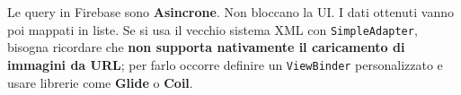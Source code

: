 Le query in Firebase sono \textbf{Asincrone}.
Non bloccano la UI. I dati ottenuti vanno poi mappati in liste.
Se si usa il vecchio sistema XML con \texttt{SimpleAdapter}, bisogna ricordare che \textbf{non supporta nativamente il caricamento di immagini da URL}; per
farlo occorre definire un \texttt{ViewBinder} personalizzato e usare librerie come \textbf{Glide} o \textbf{Coil}.